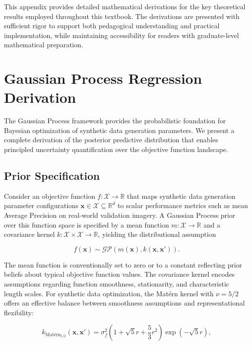 
This appendix provides detailed mathematical derivations for the key theoretical results employed throughout this textbook. The derivations are presented with sufficient rigor to support both pedagogical understanding and practical implementation, while maintaining accessibility for readers with graduate-level mathematical preparation.

\section{Gaussian Process Regression Derivation}
\label{sec:gp_derivation}

The Gaussian Process framework provides the probabilistic foundation for Bayesian optimization of synthetic data generation parameters. We present a complete derivation of the posterior predictive distribution that enables principled uncertainty quantification over the objective function landscape.

\subsection{Prior Specification}

Consider an objective function $f: \mathcal{X} \rightarrow \mathbb{R}$ that maps synthetic data generation parameter configurations $\mathbf{x} \in \mathcal{X} \subseteq \mathbb{R}^d$ to scalar performance metrics such as mean Average Precision on real-world validation imagery. A Gaussian Process prior over this function space is specified by a mean function $m: \mathcal{X} \rightarrow \mathbb{R}$ and a covariance kernel $k: \mathcal{X} \times \mathcal{X} \rightarrow \mathbb{R}$, yielding the distributional assumption

\begin{equation}
f(\mathbf{x}) \sim \mathcal{GP}\left(m(\mathbf{x}), k(\mathbf{x}, \mathbf{x}')\right).
\end{equation}

The mean function is conventionally set to zero or to a constant reflecting prior beliefs about typical objective function values. The covariance kernel encodes assumptions regarding function smoothness, stationarity, and characteristic length scales. For synthetic data optimization, the Mat\'{e}rn kernel with $\nu = 5/2$ offers an effective balance between smoothness assumptions and representational flexibility:

\begin{equation}
k_{\text{Mat\'{e}rn}_{5/2}}(\mathbf{x}, \mathbf{x}') = \sigma_f^2 \left(1 + \sqrt{5}r + \frac{5}{3}r^2\right) \exp\left(-\sqrt{5}r\right),
\end{equation}

